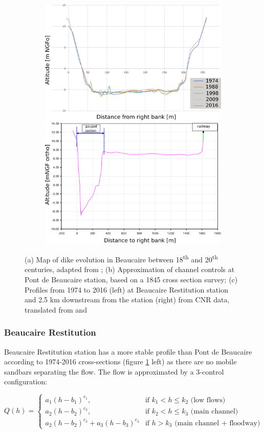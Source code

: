 \documentclass[11pt]{article}
\begin{document}
\begin{figure}[h!]
            \begin{subfigure}{.9\linewidth}
            \includegraphics[width=.48\linewidth]{Figs/3c-ProfilsBardRestit.png}
            \includegraphics[width=.48\linewidth]{Figs/3c-ProfilAvalRestitEN.png}
            \caption{}
            \label{subfig:avalprofilesRestit}
            \end{subfigure}
            
            \caption{(a) Map of dike evolution in Beaucaire between 18\textsuperscript{th} and 20\textsuperscript{th} centuries, adapted from \citet{armand_ii_1907}; (b) Approximation of channel controls at Pont de Beaucaire station, based on a 1845 cross section survey; (c) Profiles from 1974 to 2016 (left) at Beaucaire Restitution station and 2.5 km downstream from the station (right) from CNR data, translated from \citet{bard_actualisation_2018} and \citet{medd_debit_2005}}
            \label{fig:groupPriorPt}
        \end{figure}


        \subsubsection{Beaucaire Restitution}
        
        Beaucaire Restitution station has a more stable profile than Pont de Beaucaire according to 1974-2016 cross-sections (figure \ref{subfig:avalprofilesRestit} left) as there are no mobile sandbars separating the flow. The flow is approximated by a 3-control configuration:
        
        \begin{equation}
        Q(h) =
          \begin{cases}
           a_1(h-b_1)^{c_1}, & \text{if $k_1 < h \leq k_2 $ (low flows) }\\
           a_2(h-b_2)^{c_2}, & \text{if $k_2 < h \leq k_3 $ (main channel)}\\
           a_2(h-b_2)^{c_2}+ a_3(h-b_3)^{c_3} & \text{if $h > k_3$ (main channel + floodway)}
          \end{cases}
          \label{eq:RcRes}
        \end{equation}
        
\end{document}
